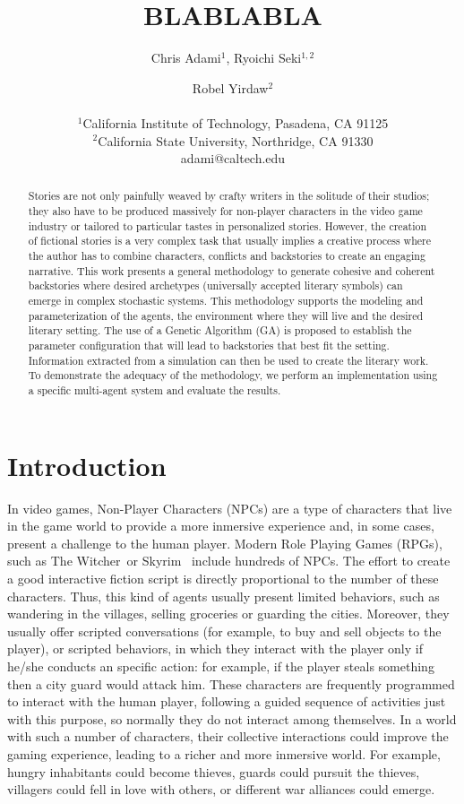 \documentclass[letterpaper]{article}
\title{BLABLABLA}
\author{Chris Adami$^{1}$, Ryoichi Seki$^{1,2}$ \and Robel Yirdaw$^2$ \\
\mbox{}\\
$^1$California Institute of Technology, Pasadena, CA 91125 \\
$^2$California State University, Northridge, CA 91330 \\
adami@caltech.edu}
\begin{document}
\maketitle

\begin{abstract}
Stories are not only painfully weaved by crafty writers in the
solitude of their studios; they also have to be produced massively for
non-player characters in the video game industry or tailored to
particular tastes in personalized stories. However, the creation of
fictional stories is a very complex task that usually implies a
creative process where the author has to combine characters, 
conflicts and backstories to create an engaging narrative.
This work presents a general methodology to generate cohesive and coherent
backstories where desired archetypes (universally accepted literary symbols) can emerge in complex stochastic systems.
This methodology supports the modeling and parameterization of the agents, the environment where they will live and the desired literary setting. The use of a Genetic Algorithm (GA) is proposed to establish the parameter configuration that will lead to backstories that best fit the setting. Information extracted from a simulation can then be used to create the literary work.
To demonstrate the adequacy of the methodology, we perform an implementation using a specific multi-agent system and evaluate the results.
\end{abstract}


\section{Introduction}

In video games, Non-Player Characters (NPCs)  are a type of characters
that live in the game world to provide a more inmersive
experience and, in some cases, present a challenge to the human player. Modern  Role Playing Games (RPGs), such as The
Witcher\texttrademark~or Skyrim\texttrademark~ include hundreds of NPCs. The effort to create a good interactive fiction script is directly proportional to the number of these characters. Thus, this kind of agents usually present limited behaviors, such as wandering in the villages, selling groceries or guarding the cities. Moreover, they usually offer scripted conversations (for example, to buy and sell objects to the player), or scripted behaviors, in which they interact with the player only if he/she conducts an specific action: for example, if the player steals something then a city guard would attack him. These characters are frequently programmed to interact with the human player, following a guided sequence of activities just with this purpose, so normally they do not interact among themselves. In a world with such a number of characters, their collective interactions could improve the gaming experience, leading to a richer and more inmersive world. For example, hungry inhabitants could become thieves, guards could pursuit the thieves, villagers could fell in love with others, or different war alliances could emerge.
\end{document}
